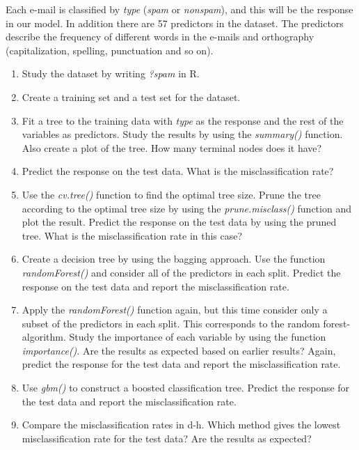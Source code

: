\documentclass[]{article}
\begin{document}
Each e-mail is classified by \emph{type} (\emph{spam} or
\emph{nonspam}), and this will be the response in our model. In addition
there are 57 predictors in the dataset. The predictors describe the
frequency of different words in the e-mails and orthography
(capitalization, spelling, punctuation and so on).

\begin{enumerate}
\def\labelenumi{\alph{enumi})}
\item
  Study the dataset by writing \emph{?spam} in R.
\item
  Create a training set and a test set for the dataset.
\item
  Fit a tree to the training data with \emph{type} as the response and
  the rest of the variables as predictors. Study the results by using
  the \emph{summary()} function. Also create a plot of the tree. How
  many terminal nodes does it have?
\item
  Predict the response on the test data. What is the misclassification
  rate?
\item
  Use the \emph{cv.tree()} function to find the optimal tree size. Prune
  the tree according to the optimal tree size by using the
  \emph{prune.misclass()} function and plot the result. Predict the
  response on the test data by using the pruned tree. What is the
  misclassification rate in this case?
\item
  Create a decision tree by using the bagging approach. Use the function
  \emph{randomForest()} and consider all of the predictors in each
  split. Predict the response on the test data and report the
  misclassification rate.
\item
  Apply the \emph{randomForest()} function again, but this time consider
  only a subset of the predictors in each split. This corresponds to the
  random forest-algorithm. Study the importance of each variable by
  using the function \emph{importance()}. Are the results as expected
  based on earlier results? Again, predict the response for the test
  data and report the misclassification rate.
\item
  Use \emph{gbm()} to construct a boosted classification tree. Predict
  the response for the test data and report the misclassification rate.
\item
  Compare the misclassification rates in d-h. Which method gives the
  lowest misclassification rate for the test data? Are the results as
  expected?
\end{enumerate}
\end{document}
